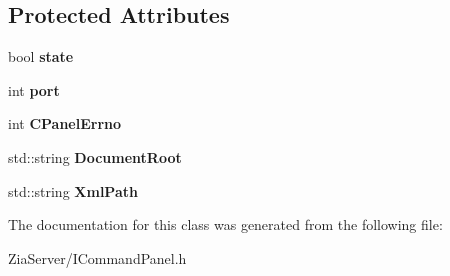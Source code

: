\subsection*{Protected Attributes}
\begin{DoxyCompactItemize}
\item 
\hypertarget{class_i_command_panel_a4f6ea46e98133e4fae91117abeec5ef6}{
bool {\bfseries state}}
\label{class_i_command_panel_a4f6ea46e98133e4fae91117abeec5ef6}

\item 
\hypertarget{class_i_command_panel_af1c73d5075c578cca49bcc62d7c438b4}{
int {\bfseries port}}
\label{class_i_command_panel_af1c73d5075c578cca49bcc62d7c438b4}

\item 
\hypertarget{class_i_command_panel_adab357fffc6bed0d5cd02b65b05206f6}{
int {\bfseries CPanelErrno}}
\label{class_i_command_panel_adab357fffc6bed0d5cd02b65b05206f6}

\item 
\hypertarget{class_i_command_panel_afe3ea1eb7fb365dfaa843edf729a525b}{
std::string {\bfseries DocumentRoot}}
\label{class_i_command_panel_afe3ea1eb7fb365dfaa843edf729a525b}

\item 
\hypertarget{class_i_command_panel_a929066b973dcaaff260127bb7b25ae95}{
std::string {\bfseries XmlPath}}
\label{class_i_command_panel_a929066b973dcaaff260127bb7b25ae95}

\end{DoxyCompactItemize}


The documentation for this class was generated from the following file:\begin{DoxyCompactItemize}
\item 
ZiaServer/ICommandPanel.h\end{DoxyCompactItemize}
